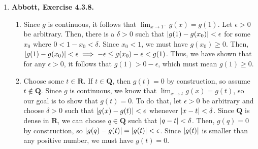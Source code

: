 \documentclass{article}
\DeclarePairedDelimiter\abs{\lvert}{\rvert}
\newcommand{\N}{\mathbf{N}}
\newcommand{\Q}{\mathbf{Q}}
\newcommand{\R}{\mathbf{R}}
\newcommand{\exc}[2][Abbott]{\item \textbf{#1, Exercise #2.}}
\newcommand{\lep}[1][L]{#1et $\epsilon > 0$ be arbitrary}
\begin{document}
\begin{enumerate}
\begin{enumerate}
        \item Let $x \in \Q$. It is clear that $t(x) > 0$. Now, construct a sequence $(x_n) \to x$ such that every $x_n$ is irrational. Then, $\lim t(x_n) = 0$, but $t(x) \neq 0$, so Corollary 4.3.3 guarantees that $t$ is not continuous at $x$.
        
        \item Let $x \notin \Q$ be arbitrary and let $(x_n) \to x$ be a sequence. We need to show that $\lim t(x_n) = t(x) = 0$. To do that, \lep[l] \space and assume for sake of contradiction that there are infinitely many $x_n$ such that $t(x_n) \geq \epsilon$. Then, we can form a subsequence $(x_{n_k})$ of $(x_n)$, which must also converge to $x$, consisting only of the terms in $(x_n)$ that satisfy $t(x_n) \geq \epsilon$. Since $\epsilon > 0$, none of the $x_{n_k}$ are irrational, which means they are all not equal to $x$. Then, we can write $x_{n_k} = p_k/q_k$ for each $k \in \N$, where $p_k, q_k$ are integers with $q_k > 0$. By Lemma (\ref{lem_rationalAproximations}), the sequence $(1/q_k)$ converges to zero. Thus, there is some $M \in \N$ such that $1/q_M < \epsilon$. But, by the construction of $(x_{n_k})$, $t(x_{n_M}) = t(p_M/q_M) = 1/q_M \geq \epsilon$, a contradiction.
        
        We can conclude that there are only finitely many $x_n$ for which $t(x_n) \geq \epsilon$. In other words, there is some $N \in \N$ such that $\abs{t(x_n)} = t(x_n) < \epsilon$ for all $n \geq N$, therefore $\lim t(x_n) = 0 = t(x)$, so $t$ is continuous at $x$.
    \end{enumerate}
    
    \exc{4.3.8}
    \begin{enumerate}
        \item Since $g$ is continuous, it follows that $\lim_{x \to 1^-} g(x) = g(1)$. \lep. Then, there is a $\delta > 0$ such that $\abs{g(1)-g(x_0)} < \epsilon$ for some $x_0$ where $0 < 1-x_0 < \delta$. Since $x_0 < 1$, we must have $g(x_0) \geq 0$. Then, $\abs{g(1)-g(x_0) } < \epsilon \implies -\epsilon \leq g(x_0)-\epsilon < g(1)$. Thus, we have shown that for any $\epsilon > 0$, it follows that $g(1) > 0 -\epsilon$, which must mean $g(1) \geq 0$.
        
        \item Choose some $t \in \R$. If $t \in \Q$, then $g(t) = 0$ by construction, so assume $t \notin \Q$. Since $g$ is continuous, we know that $\lim_{x \to t} g(x) = g(t)$, so our goal is to show that $g(t) = 0$. To do that, \lep[l] \space and choose $\delta > 0$ such that $\abs{g(x)-g(t)} < \epsilon$ whenever $\abs{x-t} < \delta$. Since $\Q$ is dense in $\R$, we can choose $q \in \Q$ such that $\abs{q-t} < \delta$. Then, $g(q) = 0$ by construction, so $\abs{g(q)-g(t)} = \abs{g(t)} < \epsilon$. Since $\abs{g(t)}$ is smaller than any positive number, we must have $g(t) = 0$.
        

\end{enumerate}
\end{enumerate}
\end{document}
